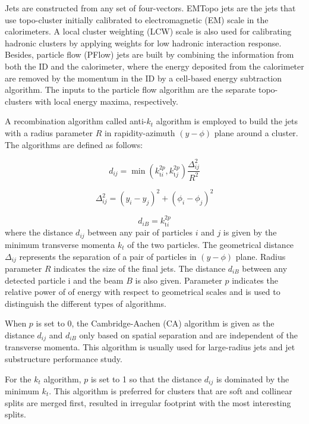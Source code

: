 Jets are constructed from any set of four-vectors. EMTopo jets are the jets that use topo-cluster initially calibrated to electromagnetic (EM) scale in the calorimeters. A local cluster weighting (LCW) scale is also used for calibrating hadronic clusters by applying weights for low hadronic interaction response. Besides, particle flow (PFlow) jets are built by combining the information from both the ID and the calorimeter, where the energy deposited from the calorimeter are removed by the momentum in the ID by a cell-based energy subtraction algorithm. The inputs to the particle flow algorithm are the separate topo-clusters with local energy maxima, respectively. 

A recombination algorithm called anti-$k_t$ algorithm is employed to build the jets with a radius parameter $R$ in rapidity-azimuth $(y-\phi)$ plane around a cluster. The algorithms are defined as follows:

\begin{equation}
d_{i j}=\min \left(k_{\mathrm{t} i}^{2 p}, k_{\mathrm{t} j}^{2 p}\right) \frac{\Delta_{i j}^2}{R^2}
\end{equation}

\begin{equation}
\Delta_{i j}^2=\left(y_i-y_j\right)^2+\left(\phi_i-\phi_j\right)^2
\end{equation}

\begin{equation}
d_{i B}=k_{\mathrm{t} i}^{2 p}
\end{equation}
where the distance $d_{i j}$ between any pair of particles $i$ and $j$ is given by the minimum transverse momenta $k_t$ of the two particles. The geometrical distance $\Delta_{i j}$ represents the separation of a pair of particles in $(y-\phi)$ plane. Radius parameter $R$ indicates the size of the final jets. The distance $d_{i B}$ between any detected particle i and the beam $B$ is also given. Parameter $p$ indicates the relative power of of energy with respect to geometrical scales and is used to distinguish the different types of algorithms.

When $p$ is set to 0,  the Cambridge-Aachen (CA) algorithm is given as the distance $d_{i j}$ and $d_{i B}$ only based on spatial separation and are independent of the transverse momenta. This algorithm is usually used for large-radius jets and jet substructure performance study.

For the $k_t$ algorithm, $p$ is set to 1 so that the distance $d_{i j}$ is dominated by the minimum $k_t$. This algorithm is preferred for clusters that are soft and collinear splits are merged first, resulted in irregular footprint with the most interesting splits.

